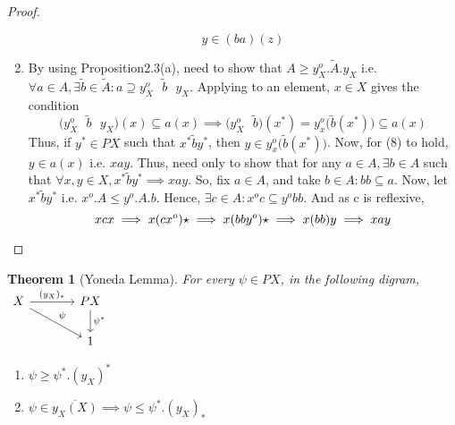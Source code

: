 \documentclass[18pt,a4paper]{article}
\newtheorem{theorem}{Theorem}[section]
\theoremstyle{definition}
\begin{document}
\begin{proof}
\begin{enumerate}[label=(\alph*)]
\[		y \in (ba)(z)\]
	\item By using Proposition2.3(a), need to show that $A\geq y_X^o.\tilde{A}.y_X$ i.e. $\forall
		a\in A, \exists \tilde{b}\in \tilde{A} :  a \supseteq y_X^o \text{ } \tilde{b} \text{ } y_X $.
		Applying to an element, $x\in X$ gives the condition
		\begin{equation}
			\Big( y_X^o \text{ } \tilde{b} \text{ } y_X \Big)(x) \subseteq a(x)
			\implies \Big( y_X^o \text{ } \tilde{b} \Big) (x^*)= y_x^o
			\Big(\tilde{b}(x^*)\Big) \subseteq a(x)
		\end{equation}
		Thus, if $y^* \in PX$ such that $x^* \tilde{b} y^*$, then
		$y \in y_x^o\Big(\tilde{b}(x^*)\Big)$. Now, for (8) to hold, $y \in a(x)$ i.e. $xay$. Thus,
		need only to show that for any $a\in A, \exists b \in A $ such that $\forall x,y \in X,
		x^* \tilde{b}y^* \implies xay $. So, fix $a\in A$, and take $b \in A: bb \subseteq a$.
		Now, let $x^* \tilde{b}y^*$ i.e. $x^o.A \leq y^o .A .b$.
		Hence, $\exists c \in A: x^oc \subseteq y^o bb$. And as c is reflexive,
		\[ xcx \implies x(cx^o)\star \implies x(bby^o)\star \implies x(bb)y \implies xay \qedhere \]
\end{enumerate}
\end{proof}
\begin{theorem}[Yoneda Lemma] %
	For every $\psi \in PX$, in the following digram,
	$\begin{tikzcd}[column sep=large ]
		X \arrow{r}{(y_X)_*}  \arrow{rd}{\psi}
  & PX \arrow{d}{\psi^*} \\
  & 1
	\end{tikzcd}$
	\begin{enumerate}[label=(\alph*)]
		\item $\psi \geq \psi^*.(y_X)^*$
		\item $\psi \in \overline{y_X(X)} \implies \psi \leq \psi^*.(y_X)_*$
	\end{enumerate}
\end{theorem}
\end{document}
